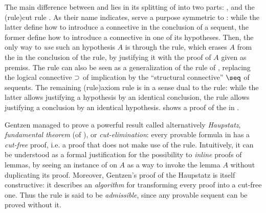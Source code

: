 The main difference between  and 
lies in its splitting of  into two parts: , and the \intro(rule){cut} rule . As their name
indicates,  serve a purpose symmetric to : while the latter define how to introduce a connective in
the conclusion of a sequent, the former define how to introduce a connective in
one of its hypotheses. Then, the only way to \emph{use} such an hypothesis $A$
is through the  rule, which erases $A$ from the  in the
conclusion of the rule, by justifying it with the proof of $A$ given as premiss.
The  rule can also be seen as a generalization of the 
rule of , replacing the logical connective $\supset$ of
implication by the ``structural connective'' $\seq$ of sequents. The remaining
\intro(rule){axiom} rule  is in a sense dual to the  rule:
while the latter allows justifying a hypothesis by an identical conclusion, the
 rule allows justifying a conclusion by an identical
hypothesis.  shows
a proof of the  in .

Gentzen managed to prove a powerful result called alternatively
\textit{Haupstatz}, \emph{fundamental theorem} (of ), or
\emph{cut-elimination}: every provable formula in  has a
\emph{cut-free} proof, i.e. a proof that does not make use of the 
rule. Intuitively, it can be understood as a formal justification for the
possibility to \emph{inline} proofs of lemmas, by seeing an instance of
 on $A$ as a way to invoke the lemma $A$ without duplicating its proof.
Moreover, Gentzen's proof of the Haupstatz is itself constructive: it describes
an \emph{algorithm} for transforming every  proof into a
cut-free one. Thus the  rule is said to be \emph{admissible}, since any
provable sequent can be proved without it.

